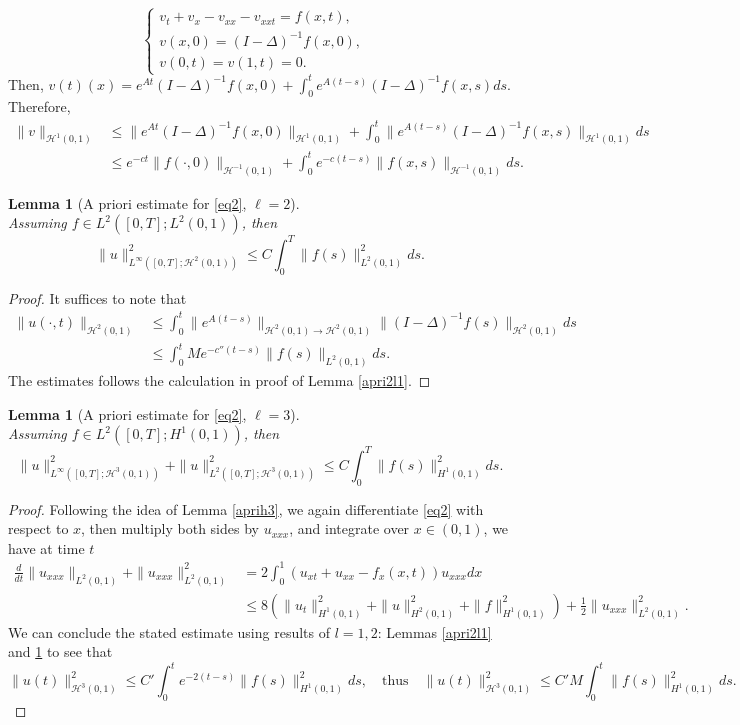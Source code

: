 \documentclass[10pt,a4paper,final]{article}
\numberwithin{equation}{section}
\newcommand{\ds}{\displaystyle}
\newtheorem{lemma}[theorem]{Lemma}
\newcommand{\cH}{\mathcal{H}}
\begin{document}
\begin{equation*}
\begin{cases}
    v_t+v_x-v_{xx}-v_{xxt}=f(x,t), &\\
    v(x,0)= (I-\Delta)^{-1}f(x,0),&\\ 
    v(0,t)=v(1,t)=0.&
\end{cases}
\end{equation*}
Then, $\ds v(t)(x)=e^{At}(I-\Delta)^{-1}f(x,0)+\int_0^{t}e^{A(t-s)}(I-\Delta)^{-1}f(x,s)ds$. Therefore, 
\begin{align*}
    \|v\|_{\cH^1(0,1)}&\leq \|e^{At}(I-\Delta)^{-1}f(x,0)\|_{\cH^1(0,1)}+ \int_0^t \|e^{A(t-s)}(I-\Delta)^{-1}f(x,s)\|_{\cH^1(0,1)}ds \\
    &\leq e^{-ct}\|f(\cdot,0)\|_{\cH^{-1}(0,1)}+\int_0^te^{-c(t-s)}\|f(x,s)\|_{\cH^{-1}(0,1)}ds.
\end{align*}
\begin{lemma}[A priori estimate for \eqref{eq2}, $\ell=2$]\ \label{apri2l2} \\
Assuming $f\in L^2([0,T];L^2(0,1))$, then 
   $$ \|u\|_{L^{\infty}([0,T];\cH^2(0,1))}^2\leq  C\int_0^T\|f(s)\|^2_{L^2(0,1)}ds. $$
\end{lemma}
\begin{proof}
    It suffices to note that 
    \begin{align*}
        \|u(\cdot,t)\|_{\cH^2(0,1)}&\leq \int_0^{t}\|e^{A(t-s)}\|_{\cH^2(0,1)\to\cH^2(0,1)}\|(I-\Delta)^{-1}f(s)\|_{\cH^2(0,1)}ds\\
        &\leq  \int_0^{t}M e^{-c''(t-s)}\|f(s)\|_{L^2(0,1)}ds.
    \end{align*}
    The estimates follows the calculation in proof of Lemma \ref{apri2l1}.
\end{proof}

\begin{lemma}[A priori estimate for \eqref{eq2}, $\ell=3$]\ \label{apriforceh3}\\
Assuming $f\in L^2([0,T];H^1(0,1))$, then 
   $$ \|u\|_{L^{\infty}([0,T];\cH^3(0,1))}^2+\|u\|_{L^{2}([0,T];\cH^3(0,1))}^2\leq  C\int_0^T\|f(s)\|^2_{H^{1}(0,1)}ds. $$
\end{lemma}
\begin{proof}
Following the idea of Lemma \ref{aprih3}, we again differentiate \eqref{eq2} with respect to $x$, then multiply both sides by $u_{xxx}$, and integrate over $x\in (0,1)$, we have at time $t$
\begin{align*}
\frac{d}{dt}\|u_{xxx}\|_{L^2(0,1)}+\|u_{xxx}\|_{L^2(0,1)}^2&=2\int_0^1(u_{xt}+u_{xx}-f_{x}(x,t))u_{xxx}dx\\
&\leq 8(\|u_{t}\|^2_{H^1(0,1)}+\|u\|^2_{H^2(0,1)}+\|f\|_{H^1(0,1)}^2)+\frac{1}{2}\|u_{xxx}\|^2_{L^2(0,1)}.
\end{align*}
We can conclude the stated estimate using results of $l=1, 2$: Lemmas \ref{apri2l1} and \ref{apri2l2} to see that
$$\|u(t)\|_{\cH^3(0,1)}^2\leq C'\int_0^t e^{-2(t-s)}\|f(s)\|_{H^1(0,1)}^2ds,\quad \text{thus}\quad  \|u(t)\|_{\cH^3(0,1)}^2\leq C'M\int_0^t\|f(s)\|_{H^1(0,1)}^2ds. $$
\end{proof}
\end{document}
